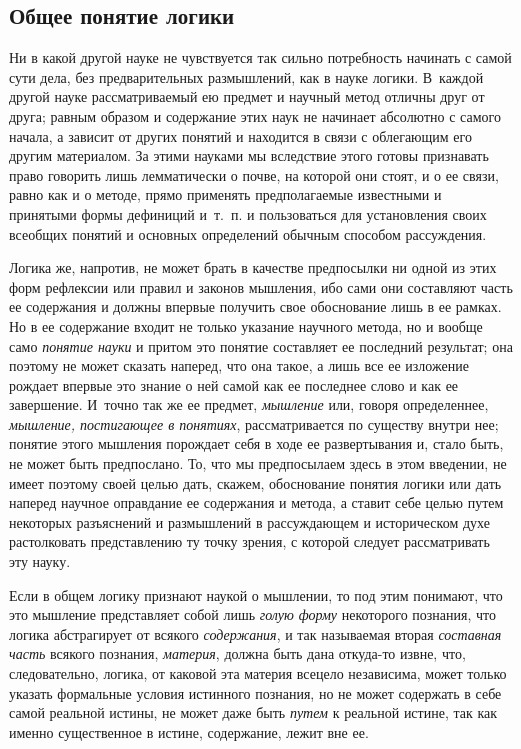 \clearpage

\subsection[Общее понятие логики]{Общее понятие логики}
Ни в какой другой науке не чувствуется так
сильно потребность начинать с самой сути дела, без предварительных
размышлений, как в науке логики. В~каждой другой науке рассматриваемый ею
предмет и научный метод отличны друг от друга; равным образом и содержание
этих наук не начинает абсолютно с самого начала, а зависит от других
понятий и находится в связи с облегающим его другим материалом. За этими
науками мы вследствие этого готовы признавать право говорить лишь
лемматически о почве, на которой они стоят, и о ее связи, равно как и о
методе, прямо применять предполагаемые известными и
принятыми формы дефиниций и~т.~п. и пользоваться для установления своих
всеобщих понятий и основных определений обычным способом рассуждения.

Логика же, напротив, не может брать в качестве предпосылки ни одной из этих
форм рефлексии или правил и законов мышления, ибо сами они составляют часть
ее содержания и должны впервые получить свое обоснование лишь в ее рамках.
Но в ее содержание входит не только указание научного метода, но и вообще
само {\em понятие науки} и притом это понятие
составляет ее последний результат; она поэтому не может сказать наперед,
что она такое, а лишь все ее изложение рождает впервые это знание о ней
самой как ее последнее слово и как ее завершение. И~точно так же ее
предмет, {\em мышление} или, говоря определеннее,
{\em мышление, постигающее в понятиях}, рассматривается
по существу внутри нее; понятие этого мышления порождает себя в ходе ее
развертывания и, стало быть, не может быть предпослано. То, что мы
предпосылаем здесь в этом введении, не имеет поэтому своей целью дать,
скажем, обоснование понятия логики или дать наперед научное оправдание ее
содержания и метода, а ставит себе целью путем некоторых разъяснений и
размышлений в рассуждающем и историческом духе растолковать представлению
ту точку зрения, с которой следует рассматривать эту науку.

Если в общем логику признают наукой о мышлении, то под этим понимают, что
это мышление представляет собой лишь {\em голую форму}
некоторого познания, что логика абстрагирует от всякого
{\em содержания}, и так называемая вторая
{\em составная часть} всякого познания,
{\em материя}, должна быть дана откуда-то извне, что,
следовательно, логика, от каковой эта материя всецело независима, может
только указать формальные условия истинного познания, но не может содержать
в себе самой реальной истины, не может даже быть
{\em путем} к реальной истине, так как именно
существенное в истине, содержание, лежит вне ее.

